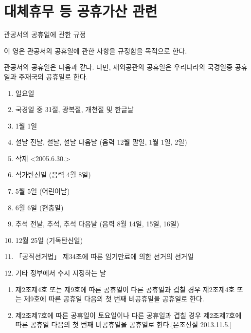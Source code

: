 ﻿\section{대체휴무 등 공휴가산 관련}

\begin{commentbox}{관공서의 공휴일에 관한 규정}
\begin{description}\tightlist
\item[제1조(목적)] 이 영은 관공서의 공휴일에 관한 사항을 규정함을 목적으로 한다.
\item[제2조(공휴일)] 관공서의 공휴일은 다음과 같다. 다만, 재외공관의 공휴일은 우리나라의 국경일중 공휴일과 주재국의 공휴일로 한다.
	\begin{enumerate}[1.]\tightlist
	\item 일요일
	\item 국경일 중 3\cntrdot{}1절, 광복절, 개천절 및 한글날
	\item 1월 1일
	\item 설날 전날, 설날, 설날 다음날 (음력 12월 말일, 1월 1일, 2일)
	\item 삭제 <2005.6.30.>
	\item 석가탄신일 (음력 4월 8일)
	\item 5월 5일 (어린이날)
	\item 6월 6일 (현충일)
	\item 추석 전날, 추석, 추석 다음날 (음력 8월 14일, 15일, 16일)
	\item 12월 25일 (기독탄신일)
	\item 「공직선거법」 제34조에 따른 임기만료에 의한 선거의 선거일
	\item 기타 정부에서 수시 지정하는 날
	\end{enumerate}
\item[제3조(대체공휴일)]
	\begin{enumerate}[①]\tightlist
	\item 제2조제4호 또는 제9호에 따른 공휴일이 다른 공휴일과 겹칠 경우 제2조제4호 또는 제9호에 따른 공휴일 다음의 첫 번째 비공휴일을 공휴일로 한다.
	\item 제2조제7호에 따른 공휴일이 토요일이나 다른 공휴일과 겹칠 경우 제2조제7호에 따른 공휴일 다음의 첫 번째 비공휴일을 공휴일로 한다.[본조신설 2013.11.5.]
	\end{enumerate}
\end{description}	
\end{commentbox}